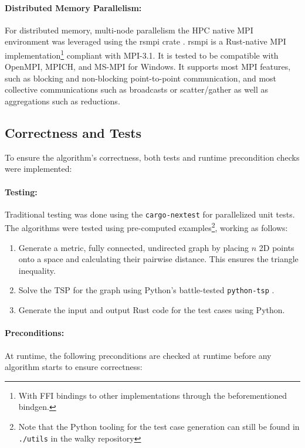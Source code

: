 \paragraph{Distributed Memory Parallelism:} For distributed memory, multi-node parallelism the \ac{HPC} native \ac{MPI} environment was leveraged using the rsmpi crate \cite{noauthor_mpi_2023}. rsmpi is a Rust-native \ac{MPI} implementation\footnote{With \ac{FFI} bindings to other implementations through the beforementioned bindgen.} compliant with MPI-3.1. It is tested to be compatible with OpenMPI, MPICH, and MS-MPI for Windows. It supports most \ac{MPI} features, such as blocking and non-blocking point-to-point communication, and most collective communications such as broadcasts or scatter/gather as well as aggregations such as reductions.

\subsection{Correctness and Tests}
To ensure the algorithm's correctness, both tests and runtime precondition checks were implemented:

\paragraph{Testing:} Traditional testing was done using the \texttt{cargo-nextest} \cite{noauthor_nextest_2023} for parallelized unit tests. The algorithms were tested using pre-computed examples\footnote{Note that the Python tooling for the test case generation can still be found in \texttt{./utils} in the walky repository}, working as follows:

\begin{enumerate}
\item Generate a metric, fully connected, undirected graph by placing $n$ 2D points onto a space and calculating their pairwise distance. This ensures the triangle inequality.
\item Solve the \ac{TSP} for the graph using Python's battle-tested \texttt{python-tsp} \cite{goulart_python_2023}.
\item Generate the input and output Rust code for the test cases using Python.
\end{enumerate}

\paragraph{Preconditions:} At runtime, the following preconditions are checked at runtime before any algorithm starts to ensure correctness:

